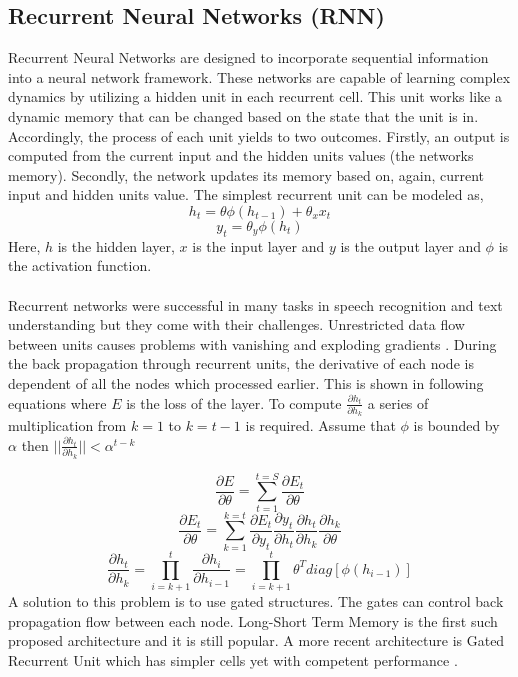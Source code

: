 \documentclass{article}
\begin{document}
\subsection{Recurrent Neural Networks (RNN)}
\label{recurrent_neural_networks}
Recurrent Neural Networks \cite{rnn2012} are designed to incorporate sequential information into a neural network framework. These networks are capable of learning complex dynamics by utilizing a hidden unit in each recurrent cell. This unit works like a dynamic memory that can be changed based on the state that the unit is in. Accordingly, the process of each unit yields to two outcomes. Firstly, an output is computed from the current input and the hidden units values (the networks memory). Secondly, the network updates its memory based on, again, current input and hidden units value. The simplest recurrent unit can be modeled as,
$$h_t = \theta \phi (h_{t-1}) + \theta_x x_t$$
$$y_t = \theta_y \phi(h_t)$$
Here, $h$ is the hidden layer, $x$ is the input layer and $y$ is the output layer and $\phi$ is the activation function.
\\\\
Recurrent networks were successful in many tasks in speech recognition and text understanding \cite{rnn2011} but they come with their challenges. Unrestricted data flow between units causes problems with vanishing and exploding gradients \cite{gradient1994}. During the back propagation through recurrent units, the derivative of each node is dependent of all the nodes which processed earlier. This is shown in following equations where $E$ is the loss of the layer. 
To compute $\frac{\partial h_t}{\partial h_k}$ a series of multiplication from $k=1$ to $k=t-1$ is required. 
Assume that $\phi$ is bounded by $\alpha$ then $|| \frac{\partial h_t}{\partial h_k} || < \alpha^{t-k}$

$$\frac{\partial E}{\partial \theta} = \sum_{t=1}^{t=S} \frac{\partial E_t}{\partial \theta}$$
$$ \frac{\partial E_t}{\partial \theta} = \sum_{k=1}^{k=t} \frac{\partial E_t}{\partial y_t} \frac{\partial y_t}{\partial h_t} \frac{\partial h_t}{\partial h_k} \frac{\partial h_k}{\partial \theta}$$
$$\frac{\partial h_t}{\partial h_k} = \prod_{i=k+1}^{t} \frac{\partial h_i}{\partial h_{i-1}} = \prod_{i=k+1}^t \theta^T diag[\phi (h_{i-1})]$$
A solution to this problem is to use gated structures. The gates can control back propagation flow between each node. Long-Short Term Memory \cite{lstm1997} is the first such proposed architecture and it is still popular. A more recent architecture is Gated Recurrent Unit \cite{encoder2014} which has simpler cells yet with competent performance \cite{rnn2014}.
\end{document}
